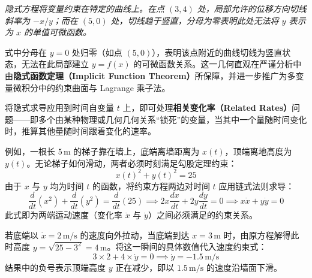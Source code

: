 \begin{center}

\emph{隐式方程将变量约束在特定的曲线上。在点 $(3,4)$ 处，局部允许的位移方向切线斜率为 $-x/y$；而在 $(5,0)$ 处，切线趋于竖直，分母为零表明此处无法将 $y$ 表示为 $x$ 的单值可微函数。}
\end{center}

式中分母在 $y=0$ 处归零（如点 $(5,0)$），表明该点附近的曲线切线为竖直状态，无法在此局部建立 $y=f(x)$ 的可微函数关系。这一几何直观在严谨分析中由\textbf{隐式函数定理（Implicit Function Theorem）}所保障，并进一步推广为多变量微积分中的约束曲面与 Lagrange 乘子法。

将隐式求导应用到时间自变量 $t$ 上，即可处理\textbf{相关变化率（Related Rates）}问题——即多个由某种物理或几何几何关系“锁死”的变量，当其中一个量随时间变化时，推算其他量随时间跟着变化的速率。

例如，一根长 \(5\,\mathrm{m}\) 的梯子靠在墙上，底端离墙距离为 \(x(t)\)，顶端离地高度为 \(y(t)\)。无论梯子如何滑动，两者必须时刻满足勾股定理约束：
\[
x(t)^2 + y(t)^2 = 25
\]
由于 \(x\) 与 \(y\) 均为时间 \(t\) 的函数，将约束方程两边对时间 \(t\) 应用链式法则求导：
\[
\frac{d}{dt}\left(x^2\right) + \frac{d}{dt}\left(y^2\right) = \frac{d}{dt}(25) 
\implies 2x\frac{dx}{dt} + 2y\frac{dy}{dt} = 0 
\implies x\dot{x} + y\dot{y} = 0
\]
此式即为两端运动速度（变化率 \(\dot{x}\) 与 \(\dot{y}\)）之间必须满足的约束关系。

若底端以 \(\dot{x} = 2\,\mathrm{m/s}\) 的速度向外拉动，当底端到达 \(x = 3\,\mathrm{m}\) 时，由原方程解得此时高度 \(y = \sqrt{25 - 3^2} = 4\,\mathrm{m}\)。将这一瞬间的具体数值代入速度约束式：
\[
3 \times 2 + 4 \times \dot{y} = 0 \implies \dot{y} = -1.5\,\mathrm{m/s}
\]
结果中的负号表示顶端高度 \(y\) 正在减少，即以 \(1.5\,\mathrm{m/s}\) 的速度沿墙面下滑。

